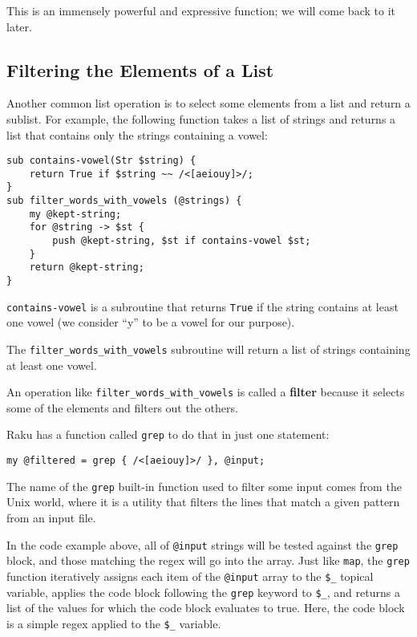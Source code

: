 This is an immensely 
powerful and expressive function; we will come back to it 
later.

\subsection{Filtering the Elements of a List}

Another common list operation is to select some elements from
a list and return a sublist.  For example, the following
function takes a list of strings and returns a list that 
contains only the strings containing a vowel:

\begin{verbatim}
sub contains-vowel(Str $string) {
    return True if $string ~~ /<[aeiouy]>/;
}
sub filter_words_with_vowels (@strings) {
    my @kept-string;
    for @string -> $st { 
        push @kept-string, $st if contains-vowel $st;
    }
    return @kept-string;
}  
\end{verbatim}
%

{\tt contains-vowel} is a subroutine that returns 
{\tt True} if the string contains at least one vowel 
(we consider ``y'' to be a vowel for our purpose).

The \verb"filter_words_with_vowels" subroutine will return 
a list of strings containing at least one vowel.

An operation like \verb"filter_words_with_vowels" is called 
a {\bf filter} because it selects some of the elements and 
filters out the others.

Raku has a function called {\tt grep} to do that in just 
one statement:

\begin{verbatim}
my @filtered = grep { /<[aeiouy]>/ }, @input;
\end{verbatim}
%

The name of the {\tt grep} built-in function used to 
filter some input comes from the Unix world, where it 
is a utility that filters the lines that 
match a given pattern from an input file.

In the code example above, all of \verb'@input' strings 
will be tested against the 
{\tt grep} block, and those matching the regex will go into the 
{\tt \@filtered} array. Just like {\tt map}, the {\tt grep} 
function iteratively assigns each item of the \verb"@input" 
array to the \verb'$_' topical variable, applies the 
code block following the {\tt grep} keyword to \verb'$_', 
and returns a list of the values for which the code block 
evaluates to true. Here, the code block is a simple regex 
applied to the \verb'$_' variable.

